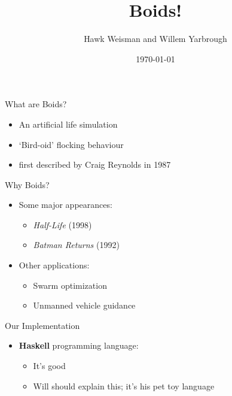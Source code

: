 \documentclass{beamer}
\title{\huge Boids!}
\author[Weisman and Yarbrough]{Hawk Weisman and Willem Yarbrough}
\institute[Allegheny College]{Department of Computer Science \\ Allegheny College}
\date{\today}
\begin{document}
\begin{frame}
  \titlepage
\end{frame}

\begin{frame}
    \huge{What are Boids?}\normalsize
    \begin{itemize}
        \item An artificial life simulation~\cite{hartman2006autonomous,reynolds1987flocks}
        \item `Bird-oid' flocking behaviour~\cite{hartman2006autonomous,reynolds1987flocks}
        \item first described by Craig Reynolds in 1987~\cite{reynolds1987flocks}
    \end{itemize}
\end{frame}

\begin{frame}
    \huge{Why Boids?}\normalsize
    \begin{itemize}
        \item Some major appearances:
        \begin{itemize}
            \item \textit{Half-Life} (1998)
            \item \textit{Batman Returns} (1992)
        \end{itemize}
        \item Other applications:
        \begin{itemize}
            \item Swarm optimization
            \item Unmanned vehicle guidance
        \end{itemize}
    \end{itemize}
\end{frame}

\begin{frame}
\huge{Our Implementation}\normalsize
\begin{itemize}
    \item \textbf{Haskell} programming language:
    \begin{itemize}
        \item It's good~\cite{hudak1994haskell}
        \item Will should explain this; it's his pet toy language
    \end{itemize}
\end{itemize}

\end{frame}
\end{document}
